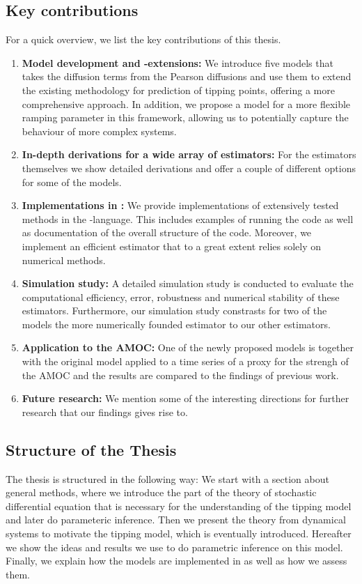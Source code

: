 \subsection{Key contributions}
For a quick overview, we list the key contributions of this thesis.
\begin{enumerate}
    \item \textbf{Model development and -extensions:} We introduce five models that takes the diffusion terms from the Pearson diffusions and use them to extend the existing methodology for prediction of tipping points, offering a more comprehensive approach. In addition, we propose a model for a more flexible ramping parameter in this framework, allowing us to potentially capture the behaviour of more complex systems.
    \item \textbf{In-depth derivations for a wide array of estimators:} For the estimators themselves we show detailed derivations and offer a couple of different options for some of the models. 
    \item \textbf{Implementations in :} We provide implementations of extensively tested methods in the -language. This includes examples of running the code as well as documentation of the overall structure of the code. Moreover, we implement an efficient estimator that to a great extent relies solely on numerical methods. 
    \item \textbf{Simulation study:} A detailed simulation study is conducted to evaluate the computational efficiency, error, robustness and numerical stability of these estimators. Furthermore, our simulation study constrasts for two of the models the more numerically founded estimator to our other estimators. 
    \item \textbf{Application to the AMOC:} One of the newly proposed models is together with the original model applied to a time series of a proxy for the strengh of the AMOC and the results are compared to the findings of previous work.
    \item \textbf{Future research:} We mention some of the interesting directions for further research that our findings gives rise to.
\end{enumerate}
\subsection{Structure of the Thesis}
The thesis is structured in the following way: We start with a section about general methods, where we  introduce the part of the theory of stochastic differential equation that is necessary for the understanding of the tipping model and later do parameteric inference. Then we present the theory from dynamical systems to motivate the tipping model, which is eventually introduced. Hereafter we show the ideas and results we use to do parametric inference on this model. Finally, we explain how the models are implemented in  as well as how we assess them. 

